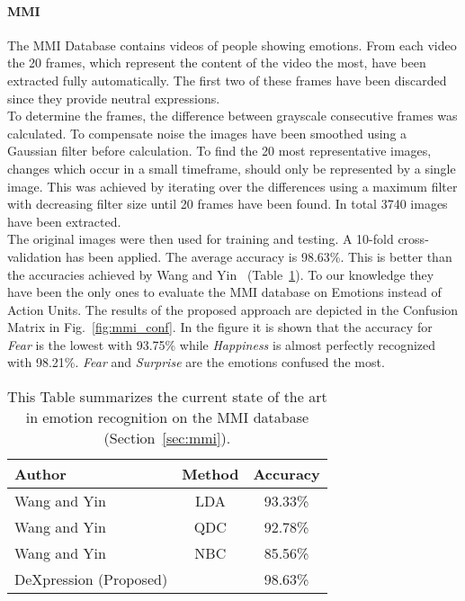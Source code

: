 \documentclass[10pt,journal,compsoc, hidelinks]{IEEEtran}
\begin{document}
\paragraph{\textbf{MMI}}
The MMI Database contains videos of people showing emotions. From each video the 20 frames, which represent the content of the video the most, have been extracted fully automatically. The first two of these frames have been discarded since they provide neutral expressions. \\
To determine the frames, the difference between grayscale consecutive frames was calculated. To compensate noise the images have been smoothed using a Gaussian filter before calculation. To find the 20 most representative images, changes which occur in a small timeframe, should only be represented by a single image. This was achieved by iterating over the differences using a maximum filter with decreasing filter size until 20 frames have been found. In total 3740 images have been extracted.\\
The original images were then used for training and testing. A 10-fold cross-validation has been applied. The average accuracy is 98.63\%. This is better than the accuracies achieved by Wang and Yin~\cite{Wang:2007:STM:1287852.1288093} (Table~\ref{tab:mmi_results}). To our knowledge they have been the only ones to evaluate the MMI database on Emotions instead of Action Units. The results of the proposed approach are depicted in the Confusion Matrix in Fig.~\ref{fig:mmi_conf}. In the figure it is shown that the accuracy for \textit{Fear} is the lowest with 93.75\% while \textit{Happiness} is almost perfectly recognized with 98.21\%. \textit{Fear} and \textit{Surprise} are the emotions confused the most. 

\begin{table}[!ht]
\caption{This Table summarizes the current state of the art in emotion recognition on the MMI database (Section~\ref{sec:mmi}).}
\label{tab:mmi_results}
\centering
\begin{tabular}{l|c|c}
\hline
Author & Method & Accuracy \\
\hline
Wang and Yin~\cite{Wang:2007:STM:1287852.1288093} & LDA & 93.33\%\\
Wang and Yin~\cite{Wang:2007:STM:1287852.1288093} & QDC & 92.78\%\\
Wang and Yin~\cite{Wang:2007:STM:1287852.1288093} & NBC & 85.56\%\\
\hline
DeXpression (Proposed) & &98.63\% \\
\hline
\end{tabular}

\end{table}
\end{document}
